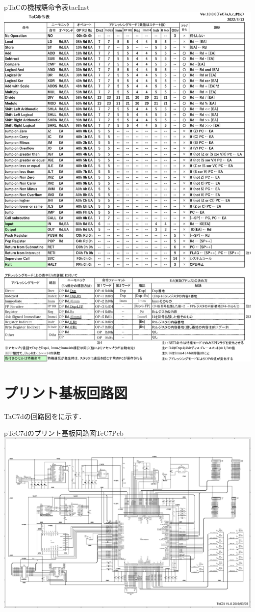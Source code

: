 \begin{myfig}{p}{TaCの機械語命令表}{tacInst}
  \includegraphics[scale=0.88,page=1]{Fig/TaCInst-crop.pdf}
\end{myfig}

\section{プリント基板回路図}
TaC7dの回路図をに示す．

\begin{myfig}{p}{TeC7dのプリント基板回路図}{TeC7Pcb}
  \includegraphics[angle=90,scale=0.85]{Fig/TeC7dPcb.pdf}
\end{myfig}
